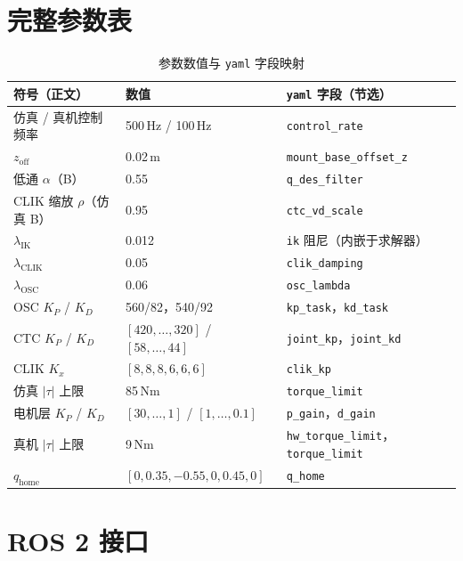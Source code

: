 \documentclass[UTF8, a4paper, 12pt]{ctexart}
\begin{document}
\appendix

\section{完整参数表}
\label{app:params}

\begin{table}[H]
  \centering
  \caption{参数数值与 \texttt{yaml} 字段映射}
  \renewcommand{\arraystretch}{1.15}
  \begin{tabular}{@{} l l l @{}}
    \toprule
    符号（正文） & 数值 & \texttt{yaml} 字段（节选） \\
    \midrule
    仿真 / 真机控制频率 & 500\,Hz / 100\,Hz & \texttt{control\_rate} \\
    $z_{\mathrm{off}}$ & 0.02\,m & \texttt{mount\_base\_offset\_z} \\
    低通 $\alpha$（B） & 0.55 & \texttt{q\_des\_filter} \\
    CLIK 缩放 $\rho$（仿真 B） & 0.95 & \texttt{ctc\_vd\_scale} \\
    $\lambda_{\mathrm{IK}}$ & 0.012 & \texttt{ik} 阻尼（内嵌于求解器） \\
    $\lambda_{\mathrm{CLIK}}$ & 0.05 & \texttt{clik\_damping} \\
    $\lambda_{\mathrm{OSC}}$ & 0.06 & \texttt{osc\_lambda} \\
    OSC $K_P$ / $K_D$ & 560/82，540/92 & \texttt{kp\_task}，\texttt{kd\_task} \\
    CTC $K_P$ / $K_D$ & $[420,\ldots,320]$ / $[58,\ldots,44]$ & \texttt{joint\_kp}，\texttt{joint\_kd} \\
    CLIK $K_x$ & $[8,8,8,6,6,6]$ & \texttt{clik\_kp} \\
    仿真 $|\tau|$ 上限 & 85\,Nm & \texttt{torque\_limit} \\
    电机层 $K_P$ / $K_D$ & $[30,\ldots,1]$ / $[1,\ldots,0.1]$ & \texttt{p\_gain}，\texttt{d\_gain} \\
    真机 $|\tau|$ 上限 & 9\,Nm & \texttt{hw\_torque\_limit}，\texttt{torque\_limit} \\
    $q_{\mathrm{home}}$ & $[0,0.35,-0.55,0,0.45,0]$ & \texttt{q\_home} \\
    \bottomrule
  \end{tabular}
\end{table}

\section{ROS 2 接口}
\label{app:ros}
\end{document}
